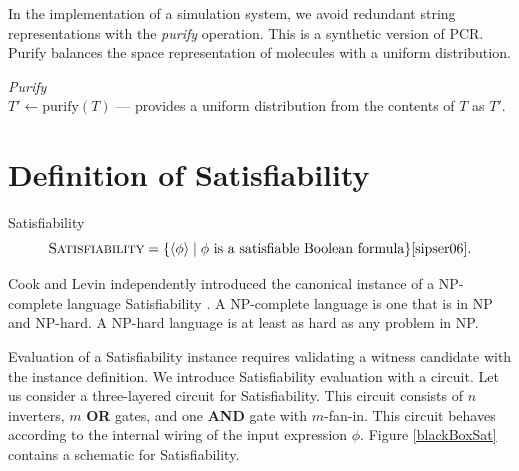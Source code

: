 In the implementation of a simulation system, we avoid redundant string representations with the \textit{purify} operation.  This is a synthetic version of PCR.  Purify balances the space representation of molecules with a uniform distribution.
\begin{definition}
\textit{Purify}\\
$T' \leftarrow \text{purify}(T)$ --- provides a uniform distribution from the contents of $T$ as $T'$.
\end{definition}


	
\section{Definition of {\sc Satisfiability}}

	

\begin{definition}
{\sc Satisfiability}\\
\[
\text{\sc Satisfiability} = \{ \langle \phi \rangle \mid \phi \text{ is a satisfiable Boolean formula}\} \cite{sipser06}.
\]	
\end{definition}

Cook and Levin independently introduced the canonical instance of a \textsf{NP-complete} language {\sc Satisfiability} \cite{Cook:1971:CTP:800157.805047, levin1973}.  A \textsf{NP-complete} language is one that is in \textsf{NP} and \textsf{NP-hard}.  A \textsf{NP-hard} language is at least as hard as any problem in \textsf{NP}.


Evaluation of a {\sc Satisfiability} instance requires validating a witness candidate with the instance definition.  We introduce {\sc Satisfiability} evaluation with a circuit.  Let us consider a three-layered circuit for {\sc Satisfiability}.  This circuit consists of $n$ inverters, $m$ \textbf{OR} gates, and one \textbf{AND} gate with $m$-fan-in.  This circuit behaves according to the internal wiring of the input expression $\phi$. Figure \ref{blackBoxSat} contains a schematic for {\sc Satisfiability}.	

